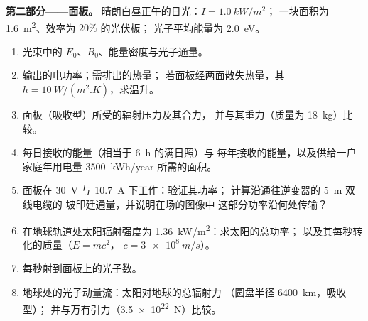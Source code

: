 \begin{problem}
\medskip
\noindent\textbf{第二部分——面板。}
晴朗白昼正午的日光：$I = \qty{1.0}{kW/m^2}$；
一块面积为 \qty{1.6}{m^2}、效率为 $20\%$ 的光伏板；
光子平均能量为 \qty{2.0}{eV}。
\begin{enumerate}[resume]
  \item 光束中的 $E_0$、$B_0$、能量密度与光子通量。
  \item 输出的电功率；需排出的热量；
        若面板经两面散失热量，其 $h = \qty{10}{W/(m^2.K)}$，求温升。
  \item 面板（吸收型）所受的辐射压力及其合力，
        并与其重力（质量为 \qty{18}{kg}）比较。
  \item 每日接收的能量（相当于 \qty{6}{h} 的满日照）与
        每年接收的能量，以及供给一户家庭年用电量
        \qty{3500}{kWh/year} 所需的面积。
  \item 面板在 \qty{30}{V} 与 \qty{10.7}{A} 下工作：验证其功率；
        计算沿通往逆变器的 \qty{5}{m} 双线电缆的
        坡印廷通量，并说明在场的图像中
        这部分功率沿何处传输？
  \item 在地球轨道处太阳辐射强度为 \qty{1.36}{kW/m^2}：求太阳的总功率；
        以及其每秒转化的质量（$E = mc^2$，
        $c = \qty{3e8}{m/s}$）。
  \item 每秒射到面板上的光子数。
  \item 地球处的光子动量流：太阳对地球的总辐射力
        （圆盘半径 \qty{6400}{km}，吸收型）；
        并与万有引力（\qty{3.5e22}{N}）比较。
\end{enumerate}


\end{problem}
